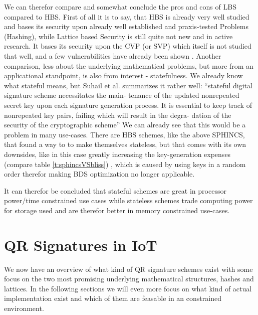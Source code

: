 \documentclass[conference]{IEEEtran}
\begin{document}
We can therefor compare and somewhat conclude the pros and cons of LBS compared to HBS.
First of all it is to say, that HBS is already very well studied and bases its security upon already well established and praxis-tested Problems (Hashing), while Lattice based Security is still quite not new and in active research. It bases its security upon the CVP (or SVP) which itself is not studied that well, and a few vulnerabilities have already been shown \cite{QR_sigs}.
Another comparison, less about the underlying mathematical problems, but more from an applicational standpoint, is also from interest - statefulness.
We already know what stateful means, but Suhail et al. summarizes it rather well: 
``stateful digital signature scheme necessitates the main- tenance of the updated nonrepeated secret key upon each signature generation process. It is essential to keep track of nonrepeated key pairs, failing which will result in the degra- dation of the security of the cryptographic scheme'' 
We can already see that this would be a problem in many use-cases.
There are HBS schemes, like the above SPHINCS, that found a way to to make themselves stateless, but that comes with its own downsides, like in this case greatly increasing the key-generation expenses (compare table \ref{t:sphincsVSbliss}) , which is caused by using keys in a random order therefor making BDS optimization no longer applicable.

It can therefor be concluded that stateful schemes are great in processor power/time constrained use cases while stateless schemes trade computing power for storage used and are therefor better in memory constrained use-cases. \cite{QR_sigs}

\section{QR Signatures in IoT}

We now have an overview of what kind of QR signature schemes exist with some focus on the two most promising underlying mathematical structures, hashes and lattices. In the following sections we will even more focus on what kind of actual implementation exist and which of them are feasable in an constrained environment.
\end{document}
